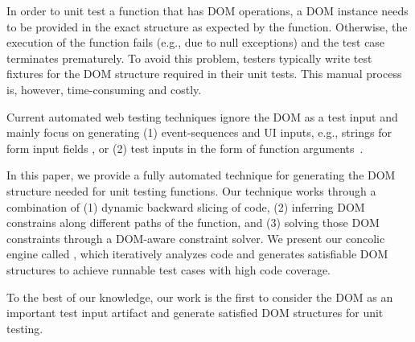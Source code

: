 In order to unit test a \js function that has DOM operations, a DOM instance needs to be provided in the exact structure as expected by the function. Otherwise, the execution of the function fails (e.g., due to null exceptions) and the test case terminates prematurely.
To avoid this problem, testers typically write test fixtures for the DOM structure required in their \js unit tests. This manual process is, however, time-consuming and costly.

Current automated web testing techniques ignore the DOM as a test input and mainly focus on generating (1) event-sequences and UI inputs, e.g., strings for form input fields \cite{mesbah:tse12, kudzu}, or (2) test inputs in the form of function arguments~\cite{artemis, pythia, jalangi}.

In this paper, we provide a fully automated technique for generating the DOM structure needed for unit testing \js functions. Our technique works through a combination of (1) dynamic backward slicing of \js code, (2) inferring DOM constrains along different paths of the function, and (3) solving those DOM constraints through a DOM-aware constraint solver. We present our concolic engine called \tool, which iteratively analyzes \js code and generates satisfiable DOM structures to achieve runnable test cases with high code coverage. 

 To the best of our knowledge, our work is the first to consider the DOM as an important test input artifact and generate satisfied DOM structures for \js unit testing.


